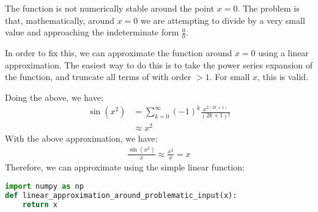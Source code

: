 \documentclass[submit]{harvardml}
\begin{document}
The function is not numerically stable around the point $x = 0$. The problem is that, mathematically, around $x = 0$ we are attempting to divide by a very small value and approaching the indeterminate form $\frac{0}{0}$.

In order to fix this, we can approximate the function around $x =0$ using a linear approximation. The easiest way to do this is to take the power series expansion of the function, and truncate all terms of with order $> 1$. For small $x$, this is valid.

Doing the above, we have:
\begin{align*}
\sin(x^2) &= \sum_{k=0}^{\infty} (-1)^{k}\frac{x^{2(2k+1)}}{(2k+1)!} \\
&\approx x^2 \tag{truncate $k > 0$ terms}
\end{align*}
With the above approximation, we have:
\begin{align*}
\frac{\sin (x^2)}{x} \approx \frac{x^2}{x} = x
\end{align*}
Therefore, we can approximate using the simple linear function:
\begin{lstlisting}[language=python]
import numpy as np
def linear_approximation_around_problematic_input(x):
    return x
\end{lstlisting}
\end{document}

